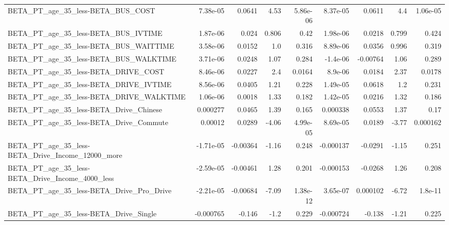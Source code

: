\begin{tabular}{lrrrrrrrr}
BETA\_PT\_age\_35\_less-BETA\_BUS\_COST                  &    7.38e-05 &       0.0641 &      4.53 & 5.86e-06 &   8.37e-05 &      0.0611 &          4.4 &      1.06e-05 \\
BETA\_PT\_age\_35\_less-BETA\_BUS\_IVTIME                &    1.87e-06 &        0.024 &     0.806 &     0.42 &   1.98e-06 &      0.0218 &        0.799 &         0.424 \\
BETA\_PT\_age\_35\_less-BETA\_BUS\_WAITTIME              &    3.58e-06 &       0.0152 &       1.0 &    0.316 &   8.89e-06 &      0.0356 &        0.996 &         0.319 \\
BETA\_PT\_age\_35\_less-BETA\_BUS\_WALKTIME              &    3.71e-06 &       0.0248 &      1.07 &    0.284 &   -1.4e-06 &    -0.00764 &         1.06 &         0.289 \\
BETA\_PT\_age\_35\_less-BETA\_DRIVE\_COST                &    8.46e-06 &       0.0227 &       2.4 &   0.0164 &    8.9e-06 &      0.0184 &         2.37 &        0.0178 \\
BETA\_PT\_age\_35\_less-BETA\_DRIVE\_IVTIME              &    8.56e-06 &       0.0405 &      1.21 &    0.228 &   1.49e-05 &      0.0618 &          1.2 &         0.231 \\
BETA\_PT\_age\_35\_less-BETA\_DRIVE\_WALKTIME            &    1.06e-06 &       0.0018 &      1.33 &    0.182 &   1.42e-05 &      0.0216 &         1.32 &         0.186 \\
BETA\_PT\_age\_35\_less-BETA\_Drive\_Chinese             &    0.000277 &       0.0465 &      1.39 &    0.165 &   0.000338 &      0.0553 &         1.37 &          0.17 \\
BETA\_PT\_age\_35\_less-BETA\_Drive\_Commute             &     0.00012 &       0.0289 &     -4.06 & 4.99e-05 &   8.69e-05 &      0.0189 &        -3.77 &      0.000162 \\
BETA\_PT\_age\_35\_less-BETA\_Drive\_Income\_12000\_more   &   -1.71e-05 &     -0.00364 &     -1.16 &    0.248 &  -0.000137 &     -0.0291 &        -1.15 &         0.251 \\
BETA\_PT\_age\_35\_less-BETA\_Drive\_Income\_4000\_less    &   -2.59e-05 &     -0.00461 &      1.28 &    0.201 &  -0.000153 &     -0.0268 &         1.26 &         0.208 \\
BETA\_PT\_age\_35\_less-BETA\_Drive\_Pro\_Drive           &   -2.21e-05 &     -0.00684 &     -7.09 & 1.38e-12 &   3.65e-07 &    0.000102 &        -6.72 &       1.8e-11 \\
BETA\_PT\_age\_35\_less-BETA\_Drive\_Single              &   -0.000765 &       -0.146 &      -1.2 &    0.229 &  -0.000724 &      -0.138 &        -1.21 &         0.225 \\

\end{tabular}
